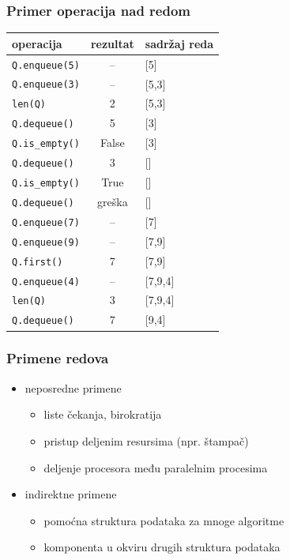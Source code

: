\documentclass[compress]{beamer}
\begin{document}
\begin{frame}[fragile,shrink=10]
  \frametitle{Primer operacija nad redom}
\begin{center}
\begin{tabular}{lcl}
\textbf{operacija} & \textbf{rezultat} & \textbf{sadržaj reda} \\
\hline \hline
\texttt{Q.enqueue(5)} & -- & [5] \\ 
\texttt{Q.enqueue(3)} & -- & [5,3] \\ 
\texttt{len(Q)} & 2 & [5,3] \\ 
\texttt{Q.dequeue()} & 5 & [3] \\ 
\texttt{Q.is\_empty()} & False & [3] \\ 
\texttt{Q.dequeue()} & 3 & [] \\ 
\texttt{Q.is\_empty()} & True & [] \\ 
\texttt{Q.dequeue()} & greška & [] \\ 
\texttt{Q.enqueue(7)} & -- & [7] \\ 
\texttt{Q.enqueue(9)} & -- & [7,9] \\ 
\texttt{Q.first()} & 7 & [7,9] \\ 
\texttt{Q.enqueue(4)} & -- & [7,9,4] \\ 
\texttt{len(Q)} & 3 & [7,9,4] \\ 
\texttt{Q.dequeue()} & 7 & [9,4] \\ 
\end{tabular}
\end{center}
\end{frame}

\begin{frame}[fragile]
  \frametitle{Primene redova}
  \begin{itemize}
    \item neposredne primene
    \begin{itemize}
      \item liste čekanja, birokratija
      \item pristup deljenim resursima (npr. štampač)
      \item deljenje procesora među paralelnim procesima
    \end{itemize}
    \item indirektne primene
    \begin{itemize}
      \item pomoćna struktura podataka za mnoge algoritme
      \item komponenta u okviru drugih struktura podataka
    \end{itemize}
  \end{itemize}
\end{frame}
\end{document}
